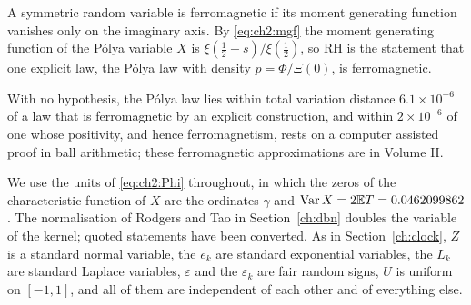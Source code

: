 \label{chap:ferro}

A symmetric random variable is ferromagnetic if its moment generating function vanishes only on the imaginary axis. By \eqref{eq:ch2:mgf} the moment generating function of the P\'olya variable $X$ is $\xi(\frac12+s)/\xi(\frac12)$, so RH is the statement that one explicit law, the P\'olya law with density $p=\Phi/\Xi(0)$, is ferromagnetic.

With no hypothesis, the P\'olya law lies within total variation distance $6.1\times10^{-6}$ of a law that is ferromagnetic by an explicit construction, and within $2\times10^{-6}$ of one whose positivity, and hence ferromagnetism, rests on a computer assisted proof in ball arithmetic; these ferromagnetic approximations are in Volume II.

We use the units of \eqref{eq:ch2:Phi} throughout, in which the zeros of the characteristic function of $X$ are the ordinates $\gamma$ and $\operatorname{Var}X=2\mathbb{E} T=0.0462099862$. The normalisation of Rodgers and Tao in Section~\ref{ch:dbn} doubles the variable of the kernel; quoted statements have been converted. As in Section~\ref{ch:clock}, $Z$ is a standard normal variable, the $e_k$ are standard exponential variables, the $L_k$ are standard Laplace variables, $\varepsilon$ and the $\varepsilon_k$ are fair random signs, $U$ is uniform on $[-1,1]$, and all of them are independent of each other and of everything else.
